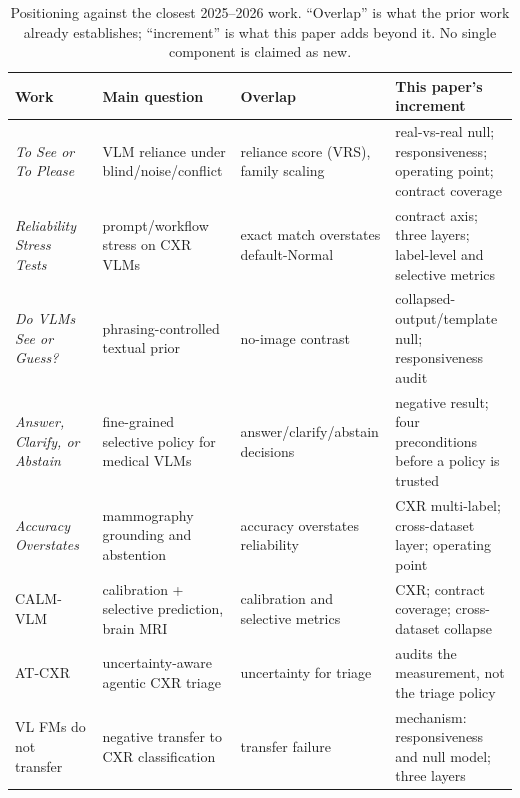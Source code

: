 \begin{table}[t]
\centering
\footnotesize
\setlength{\tabcolsep}{3pt}
\caption{Positioning against the closest 2025--2026 work. ``Overlap'' is what the prior work already establishes; ``increment'' is what this paper adds beyond it. No single component is claimed as new.}
\label{tab:competitors}
\begin{tabular}{@{}>{\raggedright\arraybackslash}p{}>{\raggedright\arraybackslash}p{}>{\raggedright\arraybackslash}p{}>{\raggedright\arraybackslash}p{}@{}}
\toprule
Work & Main question & Overlap & This paper's increment \\
\midrule
\emph{To See or To Please}~\citep{hong2026see} & VLM reliance under blind/noise/conflict & reliance score (VRS), family scaling & real-vs-real null; responsiveness; operating point; contract coverage \\
\emph{Reliability Stress Tests}~\citep{yang2026stress} & prompt/workflow stress on CXR VLMs & exact match overstates default-Normal & contract axis; three layers; label-level and selective metrics \\
\emph{Do VLMs See or Guess?}~\citep{singla2026guess} & phrasing-controlled textual prior & no-image contrast & collapsed-output/template null; responsiveness audit \\
\emph{Answer, Clarify, or Abstain}~\citep{nguyen2026answer} & fine-grained selective policy for medical VLMs & answer/clarify/abstain decisions & negative result; four preconditions before a policy is trusted \\
\emph{Accuracy Overstates}~\citep{qu2026accuracy} & mammography grounding and abstention & accuracy overstates reliability & CXR multi-label; cross-dataset layer; operating point \\
CALM-VLM~\citep{dhinagar2026calm} & calibration + selective prediction, brain MRI & calibration and selective metrics & CXR; contract coverage; cross-dataset collapse \\
AT-CXR~\citep{li2025atcxr} & uncertainty-aware agentic CXR triage & uncertainty for triage & audits the measurement, not the triage policy \\
VL FMs do not transfer~\citep{fisher2025negative} & negative transfer to CXR classification & transfer failure & mechanism: responsiveness and null model; three layers \\
\bottomrule
\end{tabular}
\end{table}

